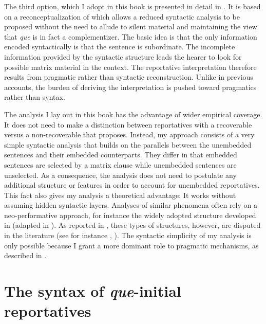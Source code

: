 The third option, which I adopt in this book is presented in detail in . It is based on a reconceptualization of   which  allows a reduced syntactic analysis to be proposed without the need to allude to silent material and maintaining the view that \emph{que} is in fact  a complementizer. The basic idea is that the only information encoded syntactically is that the sentence is subordinate. The incomplete information provided by the  syntactic structure leads the hearer to look for possible matrix material in the context. The  reportative interpretation therefore results from  pragmatic rather than  syntactic reconstruction. Unlike in previous accounts, the burden of deriving the interpretation is pushed toward pragmatics rather than syntax. 





The analysis I lay out  in this book  has the advantage of wider empirical coverage. It does not  need to make a distinction between  reportatives with a  recoverable versus a non-recoverable \emph{} that \citet{Corr2016} proposes. Instead, my approach consists of a very simple syntactic analysis that builds on the parallels between the  unembedded sentences and their embedded counterparts. They   differ in that embedded sentences are selected by a matrix clause while  unembedded sentences are unselected. As a consequence, the analysis  does not need to postulate any additional structure or features  in order to account for unembedded reportatives.
This fact also gives my analysis a theoretical advantage: It works  without assuming hidden syntactic layers. Analyses of similar phenomena often rely on a neo-performative approach, for instance the  widely adopted structure developed in \citet{SpeasTenny2003} (adapted in \citealt{Corr2016}). 
As reported in , these types of structures, however, are disputed in the literature (see for instance \citealt{Gaertner2006}, \citealt{Alcazar2014}). The syntactic simplicity  of my analysis is only possible because I grant a more dominant role to pragmatic mechanisms, as described in .




\pagebreak\section{The syntax of \emph{que}-initial reportatives}\label{sec:insubsynprop}\largerpage[2]


